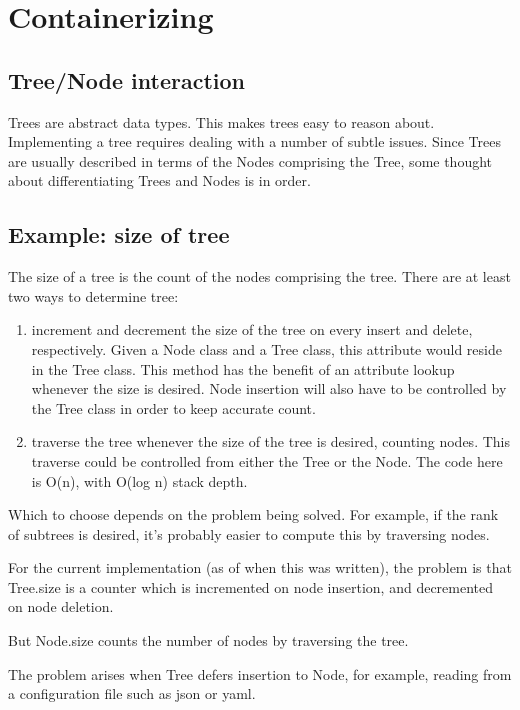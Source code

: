 \section{Containerizing}

\subsection{Tree/Node interaction}

Trees are abstract data types. This makes trees easy to reason about.
Implementing a tree requires dealing with a number of subtle issues.
Since Trees are usually described in terms of the Nodes comprising
the Tree, some thought about differentiating Trees and Nodes is in order.

\subsection{Example: size of tree}

The size of a tree is the count of the nodes comprising the tree. There are at least
two ways to determine tree:

\begin{enumerate}
  \item increment and decrement the size of the tree on every insert and delete,
  respectively. Given a Node class and a Tree class, this attribute would reside
  in the Tree class. This method has the benefit of an attribute lookup whenever
  the size is desired. Node insertion will also have to be controlled by the Tree
  class in order to keep accurate count.
  \item traverse the tree whenever the size of the tree is desired, counting nodes.
  This traverse could be controlled from either the Tree or the Node. The code here is
  O(n), with O(log n) stack depth.
\end{enumerate}

Which to choose depends on the problem being solved. For example, if the rank of
subtrees is desired, it's probably easier to compute this by traversing nodes.

For the current implementation (as of when this was written), the problem is that
Tree.size is a counter which is incremented on node insertion, and decremented on
node deletion.

But Node.size counts the number of nodes by traversing the tree.

The problem arises when Tree defers insertion to Node, for example,
reading from a configuration file such as json or yaml.

